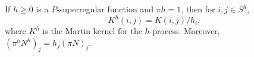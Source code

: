 If $h \geq 0$ is a $P$-superregular function and $\pi h = 1$, then for $i, j \in S^h$,
$$K^h(i, j) = K(i, j) / h_i,$$
where $K^h$ is the Martin kernel for the $h$-process. Moreover, $(\pi^h N^h)_j = h_j (\pi N)_j$.
